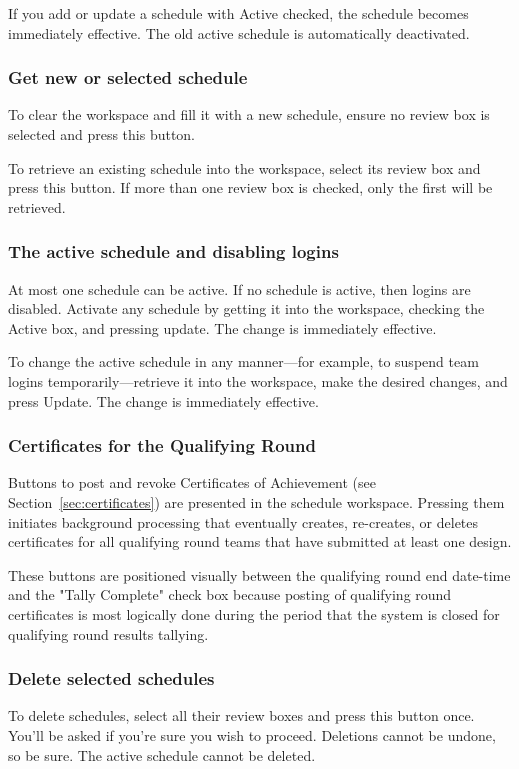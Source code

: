 \documentclass[11pt,letterpaper]{refart}
\def\ui#1{\textsf{#1}}
\begin{document}
If you add or update a schedule with \ui{Active} checked, the schedule
becomes immediately effective. The old active schedule is
automatically deactivated.

\subsubsection{Get new or selected schedule}
To clear the workspace and fill it with a new schedule, ensure no
review box is selected and press this button.

To retrieve an existing schedule into the workspace, select its review
box and press this button. If more than one review box is checked,
only the first will be retrieved.

\subsubsection{The active schedule and disabling logins}
At most one schedule can be active. If no schedule is active, then
logins are disabled.  Activate any schedule by getting it into the
workspace, checking the \ui{Active} box, and pressing \ui{update}. The
change is immediately effective.

To change the active schedule in any manner---for example, to suspend
team logins temporarily---retrieve it into the workspace, make the
desired changes, and press \ui{Update}. The change is immediately
effective.

\subsubsection{Certificates for the Qualifying Round}
Buttons to post and revoke Certificates of Achievement (see
Section~\ref{sec:certificates}) are presented in the schedule
workspace. Pressing them initiates background processing that
eventually creates, re-creates, or deletes certificates for all
qualifying round teams that have submitted at least one design.

These buttons are positioned visually between the qualifying round end
date-time and the "Tally Complete" check box because posting of
qualifying round certificates is most logically done during the period
that the system is closed for qualifying round results tallying.

\subsubsection{Delete selected schedules}
To delete schedules, select all their review boxes and press this
button once. You'll be asked if you're sure you wish to
proceed. Deletions cannot be undone, so be sure. The active schedule
cannot be deleted.
\end{document}
